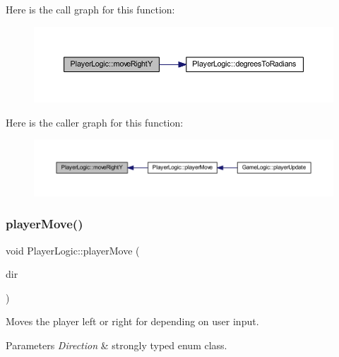 Here is the call graph for this function\+:\nopagebreak
\begin{figure}[H]
\begin{center}
\leavevmode
\includegraphics[width=350pt]{class_player_logic_a4b77bba06ba630f974aaa85306109485_cgraph}
\end{center}
\end{figure}
Here is the caller graph for this function\+:
\nopagebreak
\begin{figure}[H]
\begin{center}
\leavevmode
\includegraphics[width=350pt]{class_player_logic_a4b77bba06ba630f974aaa85306109485_icgraph}
\end{center}
\end{figure}
\mbox{\label{class_player_logic_a2b63d2c01e898e5798c2801466c8b432}} 
\subsubsection{\texorpdfstring{player\+Move()}{playerMove()}}
{\footnotesize\ttfamily void Player\+Logic\+::player\+Move (\begin{DoxyParamCaption}\item[{\hyperlink{_game_common_data_8h_a224b9163917ac32fc95a60d8c1eec3aa}{Direction}}]{dir }\end{DoxyParamCaption})\hspace{0.3cm}{\ttfamily [virtual]}}



Moves the player left or right for depending on user input. 


\begin{DoxyParams}{Parameters}
{\em Direction} & strongly typed enum class. \\
\hline
\end{DoxyParams}


